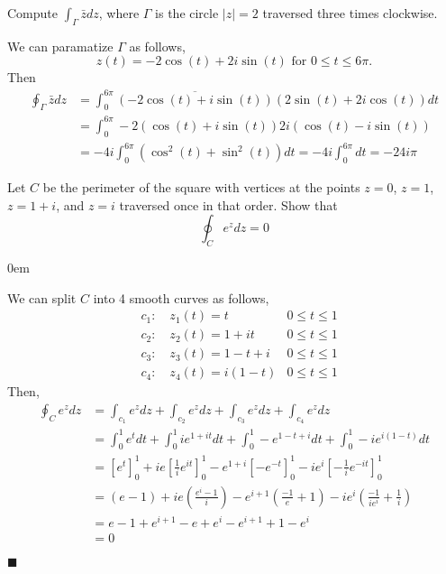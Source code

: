 \documentclass[12pt]{article}
\author{Warren Atkison}
\date{\today}
\renewcommand{\qed}{\hfill$\blacksquare$}
\renewenvironment{proof}{\vspace{1em}\begin{addmargin}[2em]{0em}\begin{newproof}}{\end{newproof}\end{addmargin}\qed}
\newenvironment{exercise}[2][Exercise]{\begin{trivlist}
\item[\hskip \labelsep {\bfseries #1} \hskip \labelsep {\bfseries #2.}]}{\end{trivlist}}
\begin{document}
\fancyhf{}
\fancyhead[R]{\today}
\fancyfoot[R]{\thepage}

\begin{exercise}{6c}
	Compute $\int_{\Gamma}\bar{z}dz$, where $\Gamma$ is the circle $|z| = 2$ traversed three times clockwise.
\end{exercise}
We can paramatize $\Gamma$ as follows,
\[
	z(t) = -2\cos(t) + 2i\sin(t) \text{ for } 0 \le t \le 6\pi.
\]
Then
\begin{align*}
	\oint_{\Gamma} \bar{z}dz &= \int_{0}^{6\pi} \overline{(-2\cos(t) + i\sin(t))}(2\sin(t) + 2i\cos(t))dt \\
				&= \int_{0}^{6\pi} -2(\cos(t) + i\sin(t))2i(\cos(t) - i\sin(t)) \\
				&= -4i\int_{0}^{6\pi} (\cos^2(t) + \sin^2(t)) dt = -4i\int_{0}^{6\pi} dt = -24i\pi
\end{align*}
\begin{exercise}{8}
	Let $C$ be the perimeter of the square with vertices at the points $z = 0$, $z = 1$, $z = 1 + i$, and $z = i$ traversed once in that order. Show that
	\[
		\oint_{C} e^zdz = 0
	\]
\end{exercise}
\begin{proof}
	We can split $C$ into 4 smooth curves as follows,
	\begin{align*}
		&c_1: \quad z_1(t) = t & 0 \le t \le 1 \\
		&c_2: \quad z_2(t) = 1 + it & 0 \le t \le 1 \\
		&c_3: \quad z_3(t) = 1 - t + i & 0 \le t \le 1 \\
		&c_4: \quad z_4(t) = i(1 - t) & 0 \le t \le 1
	\end{align*}
	Then,
	\begin{align*}
		\oint_{C}e^zdz &= \int_{c_1}e^zdz + \int_{c_2}e^zdz + \int_{c_3}e^zdz + \int_{c_4}e^zdz \\
			       &= \int_{0}^{1} e^tdt + \int_{0}^{1} ie^{1 + it}dt + \int_{0}^{1} -e^{1 - t + i}dt + \int_{0}^{1} -ie^{i(1 - t)}dt \\
			       &= \left[e^t\right]_{0}^{1} + ie\left[\frac{1}{i}e^{it}\right]_{0}^{1} - e^{1+i}\left[-e^{-t}\right]_{0}^{1} - ie^{i}\left[-\frac{1}{i}e^{-it}\right]_{0}^{1} \\
			       &= (e - 1) + ie\left(\frac{e^{i} - 1}{i}\right) - e^{i+1}\left(\frac{-1}{e} + 1\right) - ie^{i}\left(\frac{-1}{ie^{i}} + \frac{1}{i}\right) \\
			       &= e - 1 + e^{i+1} - e + e^i - e^{i+1} + 1 - e^{i} \\
			       &= 0
	\end{align*}
\end{proof}
\end{document}
